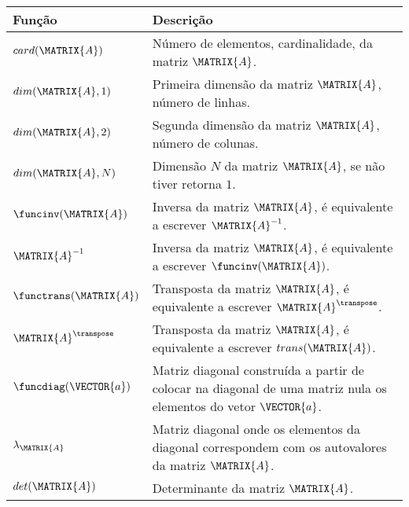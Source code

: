 \begin{notation}~\\
\begin{tabular}{p{} |  p{} }
\hline	
\textbf{Função} & \textbf{Descrição} \\ \hline
$card(\MATRIX{A})$ & Número de elementos, cardinalidade, da matriz $\MATRIX{A}$. \\
\hline
$dim(\MATRIX{A},1)$ & Primeira dimensão da matriz $\MATRIX{A}$, número de linhas. \\
$dim(\MATRIX{A},2)$ & Segunda dimensão da matriz $\MATRIX{A}$, número de colunas. \\
$dim(\MATRIX{A},N)$ & Dimensão $N$ da matriz $\MATRIX{A}$, se não tiver retorna $1$. \\
\hline
$\funcinv(\MATRIX{A})$ & Inversa da matriz $\MATRIX{A}$, é equivalente a escrever $\MATRIX{A}^{-1}$. \\
$\MATRIX{A}^{-1}$ & Inversa da matriz $\MATRIX{A}$, é equivalente a escrever $\funcinv(\MATRIX{A})$. \\
\hline
$\functrans(\MATRIX{A})$ & Transposta da matriz $\MATRIX{A}$, é equivalente a escrever $\MATRIX{A}^{\transpose}$. \\
$\MATRIX{A}^{\transpose}$ & Transposta da matriz $\MATRIX{A}$, é equivalente a escrever $trans(\MATRIX{A})$. \\
\hline
$\funcdiag(\VECTOR{a})$ & Matriz diagonal construída a partir de colocar na diagonal de uma matriz nula os elementos do vetor $\VECTOR{a}$. \\
\hline
$\lambda_{\MATRIX{A}}$ & Matriz diagonal onde os elementos da diagonal correspondem com os autovalores da matriz $\MATRIX{A}$. \\
\hline
$det(\MATRIX{A})$ & Determinante da matriz $\MATRIX{A}$. \\
\hline
\end{tabular}
\end{notation}

